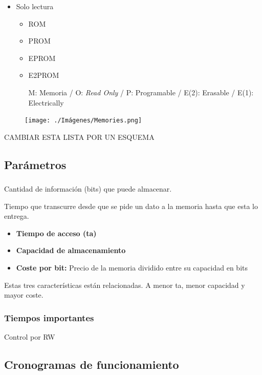 \documentclass[a4paper]{book}
\begin{document}
\begin{itemize}
\begin{itemize}
\begin{itemize}
			   \item Solo lectura 
			   \begin{itemize}
					\item ROM
					\item PROM 
					\item EPROM 
					\item E2PROM
					
					M: Memoria
					/ O: \textit{Read Only}
					/ P: Programable
					/ E(2): Erasable
					/ E(1): Electrically
			   \end{itemize}
		  \end{itemize}
	 \end{itemize}
\end{itemize}

\begin{figure}[t!]
	\centering
		\texttt{[image: ./Imágenes/Memories.png]}
\end{figure}

CAMBIAR ESTA LISTA POR UN ESQUEMA

\subsection{Parámetros}
\subsubsection{}
Cantidad de información (bits) que puede almacenar.


Tiempo que transcurre desde que se pide un dato a la memoria hasta que esta lo entrega.

\begin{itemize}
	 \item \textbf{Tiempo de acceso (ta)}
	 \item \textbf{Capacidad de almacenamiento}
	 \item \textbf{Coste por bit:} Precio de la memoria dividido entre su capacidad en bits
\end{itemize}

Estas tres características están relacionadas.
A menor ta, menor capacidad y mayor coste.

\subsubsection{Tiempos importantes}


Control por RW


\subsection{Cronogramas de funcionamiento}
\end{document}
